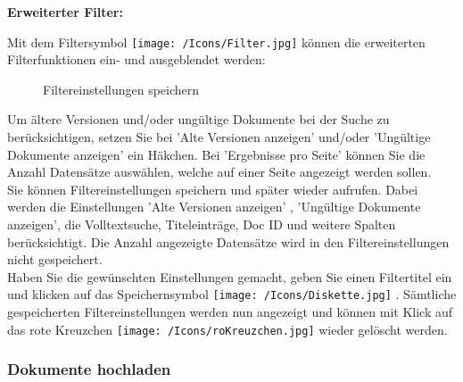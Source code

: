 \vspace{\baselineskip}

\textbf{Erweiterter Filter:}\\
\label{bkm:Ref201704051}

Mit dem Filtersymbol \texttt{[image: /Icons/Filter.jpg]}  können die erweiterten Filterfunktionen ein- und ausgeblendet werden:

\begin{figure}[H]
\caption{Filtereinstellungen speichern}
\end{figure}

Um ältere Versionen und/oder ungültige Dokumente bei der Suche zu berücksichtigen, setzen Sie bei 'Alte Versionen anzeigen'  und/oder 'Ungültige Dokumente anzeigen'  ein Häkchen. Bei 'Ergebnisse pro Seite'  können Sie die Anzahl Datensätze auswählen, welche auf einer Seite angezeigt werden sollen.\\
Sie können Filtereinstellungen speichern und später wieder aufrufen. Dabei werden die Einstellungen 'Alte Versionen anzeigen' , 'Ungültige Dokumente anzeigen', die Volltextsuche, Titeleinträge, Doc ID und weitere Spalten berücksichtigt. Die Anzahl angezeigte Datensätze wird in den Filtereinstellungen nicht gespeichert.\\
Haben Sie die gewünschten Einstellungen gemacht, geben Sie einen Filtertitel ein  und klicken auf das Speichernsymbol \texttt{[image: /Icons/Diskette.jpg]} . Sämtliche gespeicherten Filtereinstellungen werden nun angezeigt  und können mit Klick auf das rote Kreuzchen \texttt{[image: /Icons/roKreuzchen.jpg]}  wieder gelöscht werden.


\subsubsection{Dokumente hochladen}
\label{bkm:Ref442863508}\label{bkm:Ref442787515}\label{bkm:Ref442778397}\label{bkm:Ref442770648}\label{bkm:Ref442769978}

